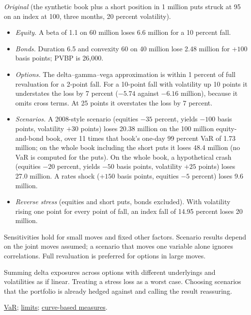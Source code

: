 \begin{qfmethod}
 \emph{Original} (the synthetic book plus a short position in 1 million puts struck at 95 on an index at 100, three months, 20 percent volatility).
\begin{itemize}
\item \emph{Equity.} A beta of 1.1 on 60 million loses 6.6 million for a 10 percent fall.
\item \emph{Bonds.} Duration 6.5 and convexity 60 on 40 million lose 2.48 million for $+100$ basis points; PVBP is 26{,}000.
\item \emph{Options.} The delta--gamma--vega approximation is within 1 percent of full revaluation for a 2-point fall. For a 10-point fall with volatility up 10 points it understates the loss by 7 percent ($-5.74$ against $-6.16$ million), because it omits cross terms. At 25 points it overstates the loss by 7 percent.
\item \emph{Scenarios.} A 2008-style scenario (equities $-35$ percent, yields $-100$ basis points, volatility $+30$ points) loses 20.38 million on the 100 million equity-and-bond book, over 11 times that book's one-day 99 percent VaR of 1.73 million; on the whole book including the short puts it loses 48.4 million (no VaR is computed for the puts). On the whole book, a hypothetical crash (equities $-20$ percent, yields $-50$ basis points, volatility $+25$ points) loses 27.0 million. A rates shock ($+150$ basis points, equities $-5$ percent) loses 9.6 million.
\item \emph{Reverse stress} (equities and short puts, bonds excluded). With volatility rising one point for every point of fall, an index fall of 14.95 percent loses 20 million.
\end{itemize}

 Sensitivities hold for small moves and fixed other factors. Scenario results depend on the joint moves assumed; a scenario that moves one variable alone ignores correlations. Full revaluation is preferred for options in large moves.

 Summing delta exposures across options with different underlyings and volatilities as if linear. Treating a stress loss as a worst case. Choosing scenarios that the portfolio is already hedged against and calling the result reassuring.

 \hyperref[meth:portfolio-var-methods-decomposition]{VaR}; \hyperref[meth:market-risk-limits-capital]{limits}; \hyperref[meth:curve-based-empirical-duration]{curve-based measures}.

\end{qfmethod}

